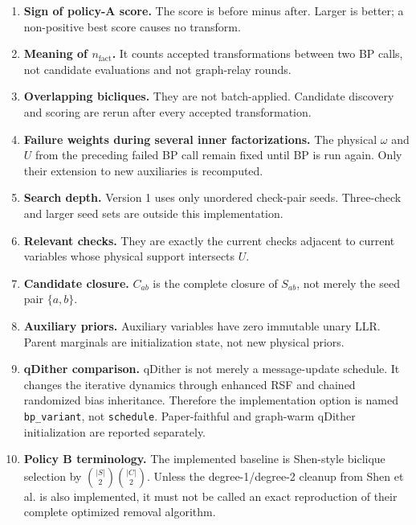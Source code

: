 \documentclass[11pt,a4paper]{article}
\begin{document}
\begin{enumerate}[leftmargin=2em]
\item \textbf{Sign of policy-A score.}
      The score is before minus after. Larger is better; a non-positive best
      score causes no transform.

\item \textbf{Meaning of $n_{\mathrm{fact}}$.}
      It counts accepted transformations between two BP calls, not candidate
      evaluations and not graph-relay rounds.

\item \textbf{Overlapping bicliques.}
      They are not batch-applied. Candidate discovery and scoring are rerun
      after every accepted transformation.

\item \textbf{Failure weights during several inner factorizations.}
      The physical $\omega$ and $U$ from the preceding failed BP call remain
      fixed until BP is run again. Only their extension to new auxiliaries is
      recomputed.

\item \textbf{Search depth.}
      Version 1 uses only unordered check-pair seeds. Three-check and larger
      seed sets are outside this implementation.

\item \textbf{Relevant checks.}
      They are exactly the current checks adjacent to current variables whose
      physical support intersects $U$.

\item \textbf{Candidate closure.}
      $C_{ab}$ is the complete closure of $S_{ab}$, not merely the seed pair
      $\{a,b\}$.

\item \textbf{Auxiliary priors.}
      Auxiliary variables have zero immutable unary LLR. Parent marginals are
      initialization state, not new physical priors.

\item \textbf{qDither comparison.}
      qDither is not merely a message-update schedule. It changes the iterative
      dynamics through enhanced RSF and chained randomized bias inheritance.
      Therefore the implementation option is named \texttt{bp\_variant}, not
      \texttt{schedule}. Paper-faithful and graph-warm qDither initialization
      are reported separately.

\item \textbf{Policy B terminology.}
      The implemented baseline is Shen-style biclique selection by
      $\binom{|S|}{2}\binom{|C|}{2}$. Unless the degree-1/degree-2 cleanup from
      Shen et al. is also implemented, it must not be called an exact
      reproduction of their complete optimized removal algorithm.


\end{enumerate}
\end{document}
